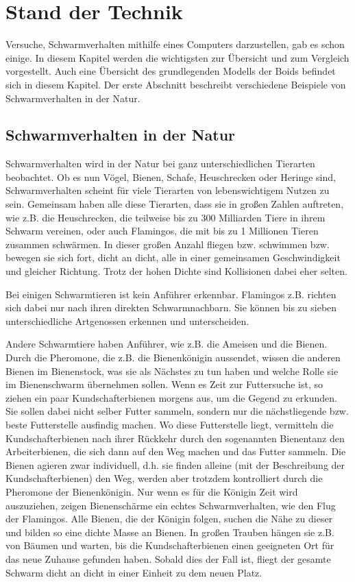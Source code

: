 \documentclass[draft=false
              ,paper=a4
              ,twoside=false
              ,fontsize=11pt
              ,headsepline
              ,BCOR10mm
              ,DIV11
              ,bibtotoc
              ,liststotoc
              ]{scrbook}
\begin{document}
\chapter{Stand der Technik}\label{stand}
Versuche, Schwarmverhalten mithilfe eines Computers darzustellen, gab es schon einige. In diesem Kapitel werden die wichtigsten zur Übersicht und zum Vergleich vorgestellt. Auch eine Übersicht des grundlegenden Modells der Boids befindet sich in diesem Kapitel. Der erste Abschnitt beschreibt verschiedene Beispiele von Schwarmverhalten in der Natur.
\section{Schwarmverhalten in der Natur}
Schwarmverhalten wird in der Natur bei ganz unterschiedlichen Tierarten beobachtet. Ob es nun Vögel, Bienen, Schafe, Heuschrecken oder Heringe sind, Schwarmverhalten scheint für viele Tierarten von lebenswichtigem Nutzen zu sein.
Gemeinsam haben alle diese Tierarten, dass sie in großen Zahlen auftreten, wie z.B. die Heuschrecken, die teilweise bis zu 300 Milliarden Tiere in ihrem Schwarm vereinen, oder auch Flamingos, die mit bis zu 1 Millionen Tieren zusammen schwärmen.
In dieser großen Anzahl fliegen bzw. schwimmen bzw. bewegen sie sich fort, dicht an dicht, alle in einer gemeinsamen Geschwindigkeit und gleicher Richtung. Trotz der hohen Dichte sind Kollisionen dabei eher selten.

Bei einigen Schwarmtieren ist kein Anführer erkennbar. Flamingos z.B. richten sich dabei nur nach ihren direkten Schwarmnachbarn. Sie können bis zu sieben unterschiedliche Artgenossen erkennen und unterscheiden.

Andere Schwarmtiere haben Anführer, wie z.B. die Ameisen und die Bienen. Durch die Pheromone, die z.B. die Bienenkönigin aussendet, wissen die anderen Bienen im Bienenstock, was sie als Nächstes zu tun haben und welche Rolle sie im Bienenschwarm übernehmen sollen. Wenn es Zeit zur Futtersuche ist, so ziehen ein paar Kundschafterbienen morgens aus, um die Gegend zu erkunden. Sie sollen dabei nicht selber Futter sammeln, sondern nur die nächstliegende bzw. beste Futterstelle ausfindig machen. Wo diese Futterstelle liegt, vermitteln die Kundschafterbienen nach ihrer Rückkehr durch den sogenannten Bienentanz den Arbeiterbienen, die sich dann auf den Weg machen und das Futter sammeln. Die Bienen agieren zwar individuell, d.h. sie finden alleine (mit der Beschreibung der Kundschafterbienen) den Weg, werden aber trotzdem kontrolliert durch die Pheromone der Bienenkönigin.
Nur wenn es für die Königin Zeit wird auszuziehen, zeigen Bienenschärme ein echtes Schwarmverhalten, wie den Flug der Flamingos. Alle Bienen, die der Königin folgen, suchen die Nähe zu dieser und bilden so eine dichte Masse an Bienen. In großen Trauben hängen sie z.B. von Bäumen und warten, bis die Kundschafterbienen einen geeigneten Ort für das neue Zuhause gefunden haben. Sobald dies der Fall ist, fliegt der gesamte Schwarm dicht an dicht in einer Einheit zu dem neuen Platz.
\end{document}
